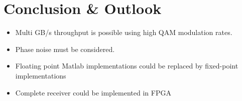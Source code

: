 \chapter{Conclusion \& Outlook}

\begin{itemize}
\item Multi GB/s throughput is possible using high \gls{QAM} modulation rates.
\item Phase noise must be considered.
\item Floating point Matlab implementations could be replaced by fixed-point implementations
\item Complete receiver could be implemented in \gls{FPGA}
\end{itemize}

